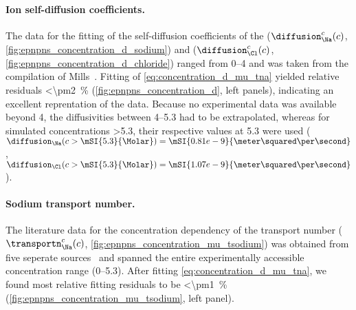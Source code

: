 \paragraph{Ion self-diffusion coefficients.}
%
The data for the fitting of the self-diffusion coefficients of the \Na{} ($\diffusion_{\Na}^c (c)$,
\cref{fig:epnpns_concentration_d_sodium}) and \Cl{} ($\diffusion_{\Cl}^c (c)$,
\cref{fig:epnpns_concentration_d_chloride}) ranged from \SIrange{0}{4}{\Molar} and was taken from the
compilation of Mills~\cite{Mills-1989}. Fitting of \cref{eq:concentration_d_mu_tna} yielded relative residuals
\SI{<\pm2}{\percent} (\cref{fig:epnpns_concentration_d}, left panels), indicating an excellent reprentation of
the data. Because no experimental data was available beyond \SI{4}{\Molar}, the diffusivities between
\SIrange{4}{5.3}{\Molar} had to be extrapolated, whereas for simulated concentrations \SI{>5.3}{\Molar}, their
respective values at \SI{5.3}{\Molar} were used (\ie~$\diffusion_{\Na} (c > \mSI{5.3}{\Molar}) =
\mSI{0.81e-9}{\meter\squared\per\second}$, $\diffusion_{\Cl} (c > \mSI{5.3}{\Molar}) =
\mSI{1.07e-9}{\meter\squared\per\second}$).

\paragraph{Sodium transport number.}
%
The literature data for the concentration dependency of the \Na{} transport number ($\transportn_{\Na}^c (c)$,
\cref{fig:epnpns_concentration_mu_tsodium}) was obtained from five seperate
sources~\cite{Esteso-1976,Haynes-2017,DellaMonica-1979,Panopoulos-1986,Schonert-2013} and spanned the entire
experimentally accessible  concentration range (\SIrange{0}{5.3}{\Molar}). After fitting
\cref{eq:concentration_d_mu_tna}, we found most relative fitting residuals to be \SI{<\pm1}{\percent}
(\cref{fig:epnpns_concentration_mu_tsodium}, left panel).


